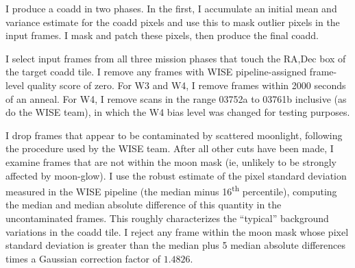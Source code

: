\documentclass[11pt,preprint]{aastex}
\begin{document}
I produce a coadd in two phases.  In the first, I accumulate an
initial mean and variance estimate for the coadd pixels and use this
to mask outlier pixels in the input frames.  I mask and patch these
pixels, then produce the final coadd.


I select input frames from all three mission phases that touch the
RA,Dec box of the target coadd tile.  I remove any frames with WISE
pipeline-assigned frame-level quality score of zero.  For W3 and W4,
I remove frames within 2000 seconds of an anneal.  For W4, I remove
scans in the range 03752a to 03761b inclusive (as do the WISE team),
in which the W4 bias level was changed for testing purposes.


I drop frames that appear to be contaminated by scattered moonlight,
following the procedure used by the WISE team.  After all other cuts
have been made, I examine frames that are not within the moon mask
(ie, unlikely to be strongly affected by moon-glow).  I use the robust
estimate of the pixel standard deviation measured in the WISE pipeline
(the median minus 16\textsuperscript{th} percentile), computing the
median and median absolute difference of this quantity in the
uncontaminated frames.  This roughly characterizes the ``typical''
background variations in the coadd tile.  I reject any frame within
the moon mask whose pixel standard deviation is greater than the
median plus 5 median absolute differences times a Gaussian correction
factor of $1.4826$.

\end{document}

